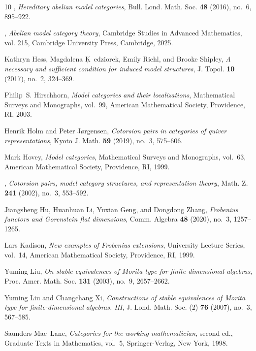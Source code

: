 \documentclass[12pt,twoside]{amsart}
\theoremstyle{bfupright head,slanted body}
\theoremstyle{bfupright head,upright body}
\theoremstyle{fixed bf head,slanted body}
\theoremstyle{fixed bf head,upright body}
\theoremstyle{numbered paragraph}
\numberwithin{equation}{res}
\begin{document}
\begin{thebibliography}{10}
\bysame, \emph{Hereditary abelian model categories}, Bull. Lond. Math. Soc.
  \textbf{48} (2016), no.~6, 895--922. 

\bysame, \emph{Abelian model category theory}, Cambridge Studies in Advanced
  Mathematics, vol. 215, Cambridge University Press, Cambridge, 2025.

Kathryn Hess, Magdalena K\c~edziorek, Emily Riehl, and Brooke Shipley, \emph{A
  necessary and sufficient condition for induced model structures}, J. Topol.
  \textbf{10} (2017), no.~2, 324--369. 

Philip~S. Hirschhorn, \emph{Model categories and their localizations},
  Mathematical Surveys and Monographs, vol.~99, American Mathematical Society,
  Providence, RI, 2003. 

Henrik Holm and Peter J{\o}rgensen, \emph{Cotorsion pairs in categories of
  quiver representations}, Kyoto J. Math. \textbf{59} (2019), no.~3, 575--606.

Mark Hovey, \emph{Model categories}, Mathematical Surveys and Monographs,
  vol.~63, American Mathematical Society, Providence, RI, 1999. 

\bysame, \emph{Cotorsion pairs, model category structures, and representation
  theory}, Math. Z. \textbf{241} (2002), no.~3, 553--592. 

Jiangsheng Hu, Huanhuan Li, Yuxian Geng, and Dongdong Zhang, \emph{Frobenius
  functors and {G}orenstein flat dimensions}, Comm. Algebra \textbf{48} (2020),
  no.~3, 1257--1265. 

Lars Kadison, \emph{New examples of {F}robenius extensions}, University Lecture
  Series, vol.~14, American Mathematical Society, Providence, RI, 1999.

Yuming Liu, \emph{On stable equivalences of {M}orita type for finite
  dimensional algebras}, Proc. Amer. Math. Soc. \textbf{131} (2003), no.~9,
  2657--2662. 

Yuming Liu and Changchang Xi, \emph{Constructions of stable equivalences of
  {M}orita type for finite-dimensional algebras. {III}}, J. Lond. Math. Soc.
  (2) \textbf{76} (2007), no.~3, 567--585. 

Saunders Mac~Lane, \emph{Categories for the working mathematician}, second ed.,
  Graduate Texts in Mathematics, vol.~5, Springer-Verlag, New York, 1998.


\end{thebibliography}
\end{document}
